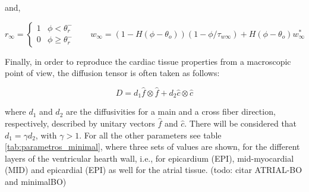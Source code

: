 and,

\begin{equation}
r_{\infty} = \left\lbrace \begin{array}{cr}
1 & \phi < \theta_r^- \\
0 & \phi \geqslant \theta_r^-
\end{array} \right.
~~~~~~~~w_{\infty} = (1 - H(\phi - \theta_o))(1 - \phi/\tau_{w\infty}) + H(\phi - \theta_o)w_{\infty}^*
\end{equation}


Finally, in order to reproduce the cardiac tissue properties from a macroscopic point of view, the diffusion tensor is often taken as follows:

\begin{equation}
D = d_1 \hat{f} \otimes \hat{f} + d_2 \hat{c} \otimes \hat{c}
\end{equation}

where $d_1$ and $d_2$ are the diffusivities for a main and a cross fiber direction, respectively, described by unitary vectors $\hat{f}$ and $\hat{c}$. There will be considered that $d_1 = \gamma                                    
d_2$, with $\gamma > 1$. For all the other parameters see table \ref{tab:parametros_minimal}, where three sets of values are shown, for the different layers of the ventricular hearth wall, i.e., for epicardium (EPI), mid-myocardial (MID) and epicardial (EPI) as well for the atrial tissue. (todo: citar ATRIAL-BO and minimalBO)

